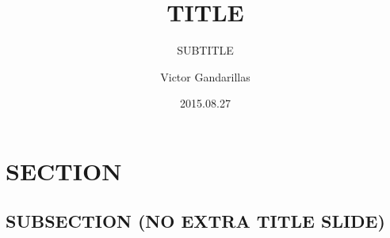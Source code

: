 \documentclass[10pt, compress]{beamer}
\title{TITLE}
\subtitle{SUBTITLE}
\author{Victor Gandarillas}
\date{2015.08.27}
\institute{INSTITUTE\\CITY}
\begin{document}
\maketitle



\section{SECTION}
\subsection{SUBSECTION (NO EXTRA TITLE SLIDE)}









\end{document}
